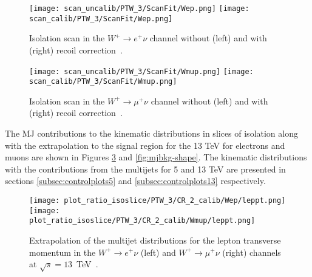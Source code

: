 \begin{figure}[htbp]
	\centering
	\texttt{[image: scan\_uncalib/PTW\_3/ScanFit/Wep.png]}
	\texttt{[image: scan\_calib/PTW\_3/ScanFit/Wep.png]}\\
	\caption{Isolation scan in the $W^+\to e^+\nu$ channel without (left) and with (right) recoil correction~\cite{mjets_int_note_6}.}
	\label{fig:mjbkg-elp-corr-scan}
\end{figure}

\begin{figure}[htbp]
	\centering
	\texttt{[image: scan\_uncalib/PTW\_3/ScanFit/Wmup.png]}
	\texttt{[image: scan\_calib/PTW\_3/ScanFit/Wmup.png]}\\
	\caption{Isolation scan in the $W^+\to \mu^+\nu$ channel without (left) and with (right) recoil correction~\cite{mjets_int_note_6}.}
	\label{fig:mjbkg-mup-corr-scan}
\end{figure}

The MJ contributions to the kinematic distributions in slices of isolation along with the extrapolation to the signal region for the 13 TeV for electrons and muons are shown in Figures \ref{fig:mjbkg-shape-lep} and \ref{fig:mjbkg-shape}. The kinematic distributions with the contributions from the multijets for 5 and 13 TeV are presented in sections \ref{subsec:controlplots5} and \ref{subsec:controlplots13} respectively.
\begin{figure}[htbp]
	\centering
	\texttt{[image: plot\_ratio\_isoslice/PTW\_3/CR\_2\_calib/Wep/leppt.png]}
	\texttt{[image: plot\_ratio\_isoslice/PTW\_3/CR\_2\_calib/Wmup/leppt.png]}\\
	\caption{Extrapolation of the multijet distributions for the lepton transverse momentum in the $W^+\to e^+\nu$ (left) and $W^+\to \mu^+\nu$ (right) channels at $\sqrt{s}=13$~TeV~\cite{mjets_int_note_6}.}
	\label{fig:mjbkg-shape-lep}
\end{figure}

